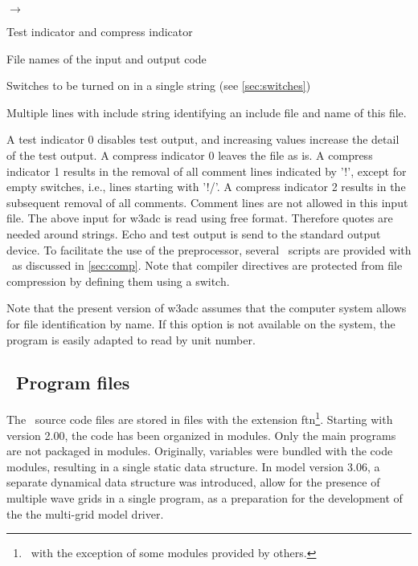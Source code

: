 

\begin{list}{$\rightarrow$}{\itemsep 0mm \parsep 0mm}
\item	Test indicator and compress indicator
\item	File names of the input and output code
\item	Switches to be turned on in a single string (see
          \para\ref{sec:switches})
\item	Multiple lines with include string identifying an
          include file and name of this file.
\end{list}

\noindent
A test indicator 0 disables test output, and increasing values increase the
detail of the test output. A compress indicator 0 leaves the file as is. A
compress indicator 1 results in the removal of all comment lines indicated by
'{\F !}', except for empty switches, i.e., lines starting with '{\F !/}'. A
compress indicator 2 results in the subsequent removal of all comments.
Comment lines are not allowed in this input file. The above input for {\F
w3adc} is read using free format. Therefore quotes are needed around
strings. Echo and test output is send to the standard output device. To
facilitate the use of the preprocessor, several \unix\ scripts are provided
with \ws\ as discussed in \para\ref{sec:comp}. Note that compiler directives
are protected from file compression by defining them using a switch.

Note that the present version of {\F w3adc} assumes that the computer
system allows for file identification by name. If this option is not available
on the system, the program is easily adapted to read by unit number.


\vssub
\subsection{~Program files} \label{sec:files}
\vssub

The \ws\ source code files are stored in files with the extension {\file
ftn}\footnote{~with the exception of some modules provided by others.}.
Starting with version 2.00, the code has been organized in modules. Only the
main programs are not packaged in modules.  Originally, variables were bundled
with the code modules, resulting in a single static data structure. In model
version 3.06, a separate dynamical data structure was introduced, allow for
the presence of multiple wave grids in a single program, as a preparation for
the development of the the multi-grid model driver.

